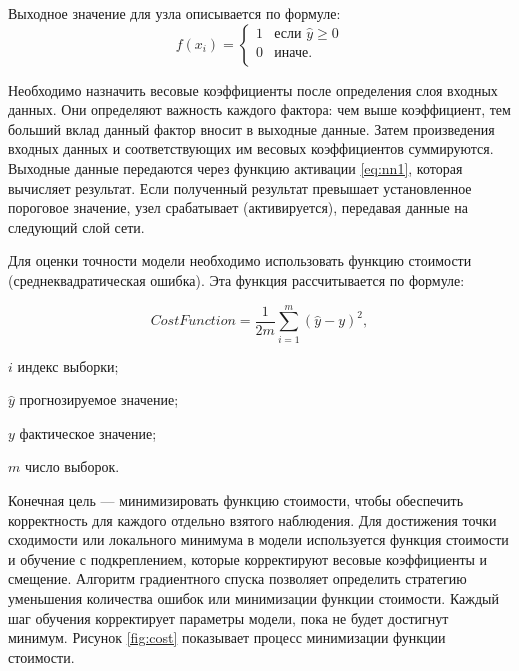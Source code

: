Выходное значение для узла описывается по формуле:
\begin{equation}
	\label{eq:nn1}
	f(x_i) = \begin{cases}
		1 & \text{если $\hat{y} \ge 0$}\\
		0 & \text{иначе.}\\
		\end{cases}
\end{equation}


Необходимо назначить весовые коэффициенты после определения слоя входных данных. Они определяют важность каждого фактора: чем выше 
коэффициент, тем больший вклад данный фактор вносит в выходные данные.
Затем произведения входных данных и соответствующих им весовых коэффициентов суммируются.
Выходные данные передаются через функцию активации \ref{eq:nn1}, которая вычисляет результат. Если полученный результат превышает установленное пороговое значение,
узел срабатывает (активируется), передавая данные на следующий слой сети.

Для оценки точности модели необходимо использовать функцию стоимости (среднеквадратическая ошибка). Эта функция рассчитывается по формуле:

\begin{equation}
	\label{eq:nn3}
	Cost Function = \frac{1}{2m}\sum_{i=1}^{m}(\hat{y}-y)^2,
\end{equation}
\begin{eqexpl}[15mm]
	\item{$i$} индекс выборки;
	\item{$\hat{y}$} прогнозируемое значение;
	\item{$y$} фактическое значение;
	\item{$m$} число выборок.
\end{eqexpl}




Конечная цель --- минимизировать функцию стоимости, чтобы обеспечить корректность для каждого отдельно взятого наблюдения. 
Для достижения точки сходимости или локального минимума в модели используется функция стоимости и обучение с подкреплением, 
которые корректируют весовые коэффициенты и смещение. Алгоритм градиентного спуска позволяет определить стратегию уменьшения 
количества ошибок или минимизации функции стоимости. Каждый шаг обучения корректирует параметры модели, пока не будет достигнут 
минимум. Рисунок \ref*{fig:cost} показывает процесс минимизации функции стоимости.

